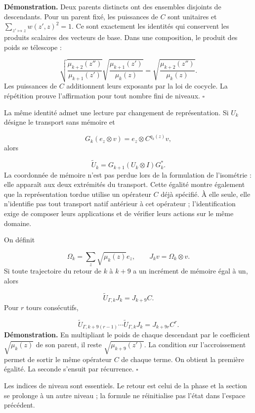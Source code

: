 \textbf{Démonstration.} Deux parents distincts ont des ensembles disjoints de descendants. Pour un parent fixé, les puissances de \(C\) sont unitaires et \(\sum_{z'\mapsto z}w(z',z)^2=1\). Ce sont exactement les identités qui conservent les produits scalaires des vecteurs de base. Dans une composition, le produit des poids se télescope :

\[
\sqrt{\frac{\mu_{k+2}(z'')}{\mu_{k+1}(z')}}
\sqrt{\frac{\mu_{k+1}(z')}{\mu_k(z)}}
=\sqrt{\frac{\mu_{k+2}(z'')}{\mu_k(z)}}.
\]
Les puissances de \(C\) additionnent leurs exposants par la loi de cocycle. La répétition prouve l'affirmation pour tout nombre fini de niveaux. \hfill\(\square\)

La même identité admet une lecture par changement de représentation. Si \(U_k\) désigne le transport sans mémoire et

\[
G_k(e_z\otimes v)=e_z\otimes C^{q_k(z)}v,
\]
alors

\[
\widetilde U_k=G_{k+1}(U_k\otimes I)G_k^*.
\]
La coordonnée de mémoire n'est pas perdue lors de la formulation de l'isométrie : elle apparaît aux deux extrémités du transport. Cette égalité montre également que la représentation tordue utilise un opérateur \(C\) déjà spécifié. À elle seule, elle n'identifie pas tout transport natif antérieur à cet opérateur ; l'identification exige de composer leurs applications et de vérifier leurs actions sur le même domaine.

On définit

\[
\Omega_k=\sum_z\sqrt{\mu_k(z)}e_z,\qquad
J_kv=\Omega_k\otimes v.
\]
Si toute trajectoire du retour de \(k\) à \(k+9\) a un incrément de mémoire égal à un, alors

\[
\widetilde U_{\Gamma,k}J_k=J_{k+9}C.
\]
Pour \(r\) tours consécutifs,

\[
\widetilde U_{\Gamma,k+9(r-1)}\cdots
\widetilde U_{\Gamma,k}J_k=J_{k+9r}C^r.
\]
\textbf{Démonstration.} En multipliant le poids de chaque descendant par le coefficient \(\sqrt{\mu_k(z)}\) de son parent, il reste \(\sqrt{\mu_{k+9}(z')}\). La condition sur l’accroissement permet de sortir le même opérateur \(C\) de chaque terme. On obtient la première égalité. La seconde s’ensuit par récurrence. \hfill\(\square\)

Les indices de niveau sont essentiels. Le retour est celui de la phase et la section se prolonge à un autre niveau ; la formule ne réinitialise pas l'état dans l'espace précédent.

